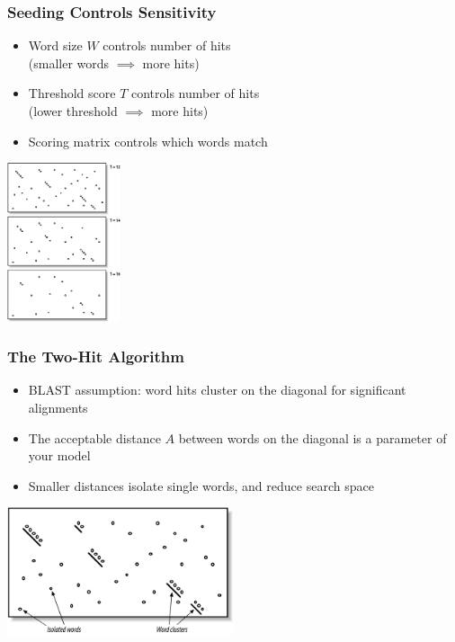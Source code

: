 \begin{frame}
  \frametitle{Seeding Controls Sensitivity}
  \begin{itemize}
    \item Word size $W$ controls number of hits \\ (smaller words $\implies$ more hits)
    \item Threshold score $T$ controls number of hits \\ (lower threshold $\implies$ more hits)
    \item Scoring matrix controls which words match
  \end{itemize}
  \begin{center}
    \includegraphics[width=0.25\textwidth]{images/seeding_t} 
  \end{center}    
\end{frame}

\begin{frame}
  \frametitle{The Two-Hit Algorithm}
  \begin{itemize}
    \item BLAST assumption: word hits cluster on the diagonal for significant alignments
    \item The acceptable distance $A$ between words on the diagonal is a parameter of your model
    \item Smaller distances isolate single words, and reduce search space
  \end{itemize}
  \begin{center}
    \includegraphics[width=0.5\textwidth]{images/two_hit} 
  \end{center}    
\end{frame}
